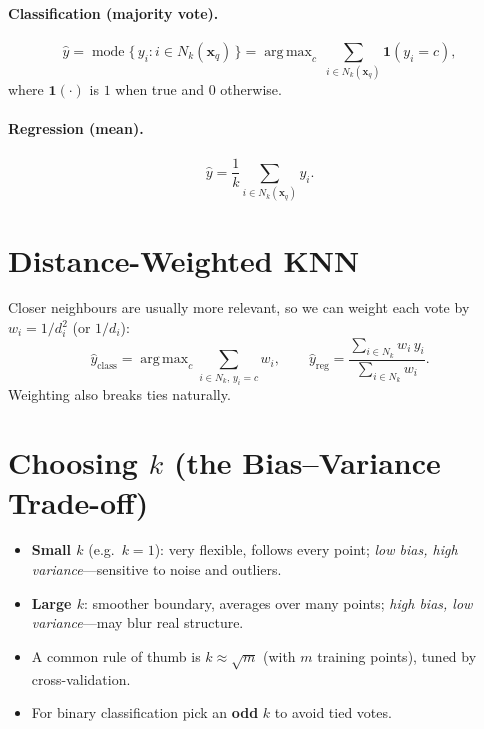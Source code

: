 \documentclass[11pt,a4paper]{report}
\theoremstyle{definition}
\theoremstyle{remark}
\newcommand{\vx}{\mathbf{x}}
\DeclareMathOperator*{\argmax}{arg\,max}
\DeclareMathOperator{\mode}{mode}
\begin{document}
	\paragraph{Classification (majority vote).}
	\begin{equation}
		\hat y=\mode\{\,y_i : i\in N_k(\vx_q)\,\}
		=\argmax_{c}\ \sum_{i\in N_k(\vx_q)}\mathbf{1}(y_i=c),
		\label{eq:vote}
	\end{equation}
	where $\mathbf{1}(\cdot)$ is $1$ when true and $0$ otherwise.
	
	\paragraph{Regression (mean).}
	\begin{equation}
		\hat y=\frac{1}{k}\sum_{i\in N_k(\vx_q)} y_i .
		\label{eq:reg}
	\end{equation}
	
	\section{Distance-Weighted KNN}
	Closer neighbours are usually more relevant, so we can weight each vote by
	$w_i=1/d_i^{2}$ (or $1/d_i$):
	\begin{equation}
		\hat y_{\text{class}}=\argmax_{c}\!\!\sum_{i\in N_k,\,y_i=c}\!\! w_i,
		\qquad
		\hat y_{\text{reg}}=\frac{\sum_{i\in N_k} w_i\,y_i}{\sum_{i\in N_k} w_i}.
		\label{eq:weighted}
	\end{equation}
	Weighting also breaks ties naturally.
	
	\section{Choosing $k$ (the Bias--Variance Trade-off)}
	\begin{itemize}[nosep]
		\item \textbf{Small $k$} (e.g.\ $k=1$): very flexible, follows every point;
		\emph{low bias, high variance}---sensitive to noise and outliers.
		\item \textbf{Large $k$}: smoother boundary, averages over many points;
		\emph{high bias, low variance}---may blur real structure.
		\item A common rule of thumb is $k\approx\sqrt{m}$ (with $m$ training points),
		tuned by cross-validation.
		\item For binary classification pick an \textbf{odd} $k$ to avoid tied votes.
	\end{itemize}
	
\end{document}
